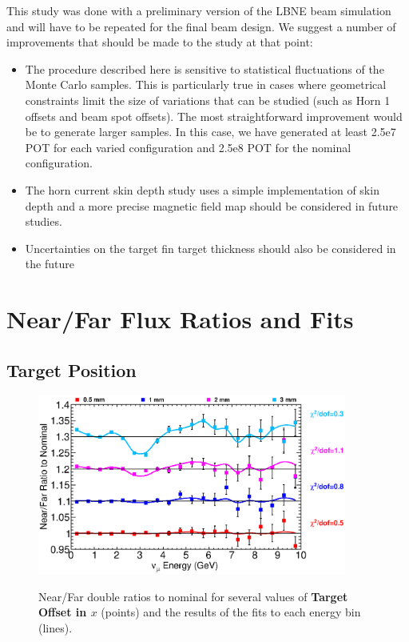 This study was done with a preliminary version of the LBNE beam simulation and will have to be repeated for the final beam design.  We suggest a number of improvements that should be made to the study at that point:
\begin{itemize}
\item The procedure described here is sensitive to statistical fluctuations of the Monte Carlo samples.  This is particularly true in cases where geometrical constraints limit the size of variations that can be studied (such as Horn 1 offsets and beam spot offsets).  The most straightforward improvement would be to generate larger samples.  In this case, we have generated at least 2.5e7 POT for each varied configuration and 2.5e8 POT for the nominal configuration.
\item The horn current skin depth study uses a simple implementation of skin depth and a more precise magnetic field map should be considered in future studies.\item Uncertainties on the target fin target thickness should also be considered in the future
\end{itemize}
   
\appendix
\section{Near/Far Flux Ratios and Fits}
\label{app:nof_plots}

\subsection{Target Position}

\begin{figure}[ht]
  \begin{center}
    {\includegraphics[width=4.0in]{figures/TargetXOffset_nof_summary.eps}}
  \end{center}
\caption{ Near/Far double ratios to nominal for several values of {\bf Target Offset in $x$} (points) and the results of the fits to each energy bin (lines).}
\end{figure}

